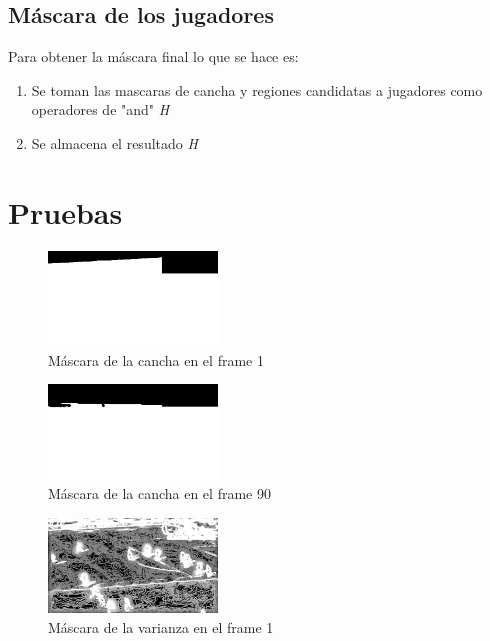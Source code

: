 \documentclass{IEEEtran}
\begin{document}
\subsection{M\'ascara de los jugadores}

Para obtener la máscara final lo que se hace es:
\begin{enumerate}
\item  Se toman las mascaras de cancha y regiones candidatas a jugadores como operadores de "and" \emph{H}
\item  Se almacena el resultado \emph{H}
\end{enumerate}


\section{Pruebas}

\begin{figure}[!ht]
  \caption{M\'ascara de la cancha en el frame 1}
  \centering
    \includegraphics[width=0.4\textwidth]{frameCancha.png}
\end{figure}

\begin{figure}[!ht]
  \caption{M\'ascara de la cancha en el frame 90}
  \centering
    \includegraphics[width=0.4\textwidth]{frameCancha90.png}
\end{figure}

\begin{figure}[!ht]
  \caption{M\'ascara de la varianza en el frame 1}
  \centering
    \includegraphics[width=0.4\textwidth]{frameVarianza.png}
\end{figure}
\end{document}
